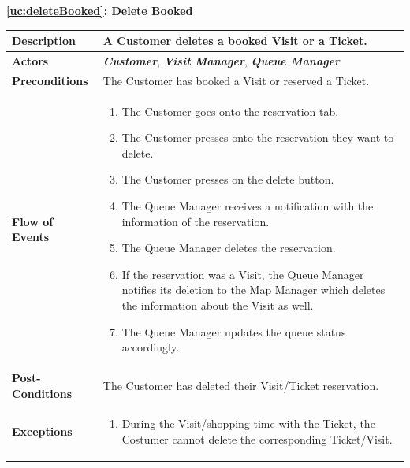 \documentclass[a4paper, 12pt, oneside]{article}
\begin{document}
\begin{center}
{\textbf{\ref{uc:deleteBooked}: Delete Booked}}
\end{center}
\begin{tabularx}{\linewidth}{| l | X |}
	
	\hline
	\textbf{Description} & A Customer deletes a booked Visit or a Ticket.\\
	

	\hline
	\textbf{Actors} & \textbf{\textit{Customer}}, \textbf{\textit{Visit Manager}}, \textit{\textbf{Queue Manager}} \\
	
	\hline
	\textbf{Preconditions} & The Customer has booked a Visit or reserved a Ticket.\\
	
	\hline
	\textbf{Flow of Events} & \parbox{0.7\textwidth}{	
		\begin{enumerate}
			\item The Customer goes onto the reservation tab.
			\item The Customer presses onto the reservation they want to delete.
			\item The Customer presses on the delete button.
			\item The Queue Manager receives a notification with the information of the reservation.
			\item The Queue Manager deletes the reservation.
			\item If the reservation was a Visit, the Queue Manager notifies its deletion to the Map Manager which deletes the information about the Visit as well.
			\item The Queue Manager updates the queue status accordingly.
	\end{enumerate}}\\
	
	\hline
	\textbf{Post-Conditions} & The Customer has deleted their Visit/Ticket reservation.\\
	
	\hline
	\textbf{Exceptions} & \parbox{0.7\textwidth}{ \begin{enumerate}
			\item During the Visit/shopping time with the Ticket, the Costumer cannot delete the corresponding Ticket/Visit.
		\end{enumerate}}\\

	\hline
\end{tabularx}
\end{document}
